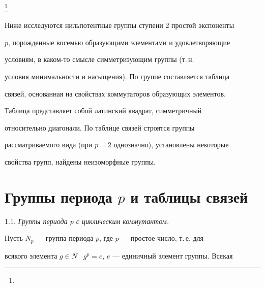 \thanks{}





\date{}




\pagestyle{plain} %







\maketitle


\label{begin}








Ниже исследуются нильпотентные группы ступени 2 простой экспоненты 


$p$, порожденные восемью образующими элементами и удовлетворяющие 


условиям, в каком-то смысле симметризующим группы (т.\,н.


условия минимальности и насыщения). По группе составляется таблица 


связей, основанная на свойствах коммутаторов образующих элементов. 


Таблица представляет собой латинский квадрат, симметричный 


относительно диагонали. По таблице связей строятся группы


рассматриваемого вида (при $p=2$ однозначно), установлены некоторые 


свойства групп, найдены неизоморфные группы.








\section{Группы периода $p$ и таблицы связей}





1.1. {\it Группы периода $p$ с циклическим коммутантом.}


Пусть $N_p$ --- группа периода $p$, где $p$ --- простое число, т.\,е. для


всякого элемента $g\in N$ \ $g^p=e$, $e$ --- единичный элемент группы. Всякая 



